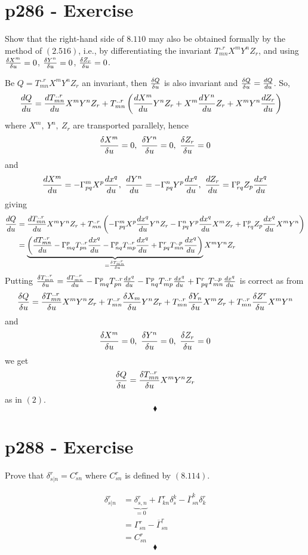 \section{p286 - Exercise}
\begin{tcolorbox}
Show that the right-hand side of $\mathbf{8.110}$ may also be obtained formally by the method of $\mathbf{(2.516)}$, i.e., by differentiating the invariant $T^{..r}_{mn}X^mY^nZ_r$, and using $\fdv{X^m}{u}=0$, $\fdv{Y^n}{u}=0$, $\fdv{Z_r}{u}=0$.
\end{tcolorbox}
Be $Q= T^{..r}_{mn}X^mY^nZ_r$ an invariant, then $\fdv{Q}{u}$ is also invariant and $\fdv{Q}{u} = \dv{Q}{u}$.
So,
\begin{align*}
\dv{Q}{u}&= \dv{T^{..r}_{mn}}{u}X^mY^nZ_r+ T^{..r}_{mn}\left(\dv{X^m}{u}Y^nZ_r+X^m\dv{Y^n}{u}Z_r +X^mY^n\dv{Z_r}{u}\right)
\end{align*}
where $X^m, \ Y^n, \ Z_r$ are transported parallely, hence  $$\fdv{X^m}{u} = 0, \ \fdv{Y^n}{u}=0 , \ \fdv{Z_r}{u}=0  $$
and 
$$\dv{X^m}{u} = -\Gamma^m_{pq}X^p\dv{x^q}{u}, \ \dv{Y^n}{u}=-\Gamma^n_{pq}Y^p\dv{x^q}{u} , \ \dv{Z_r}{u}=\Gamma^p_{rq}Z_p\dv{x^q}{u}  $$
giving
\begin{align}
\dv{Q}{u} &= \dv{T^{..r}_{mn}}{u}X^mY^nZ_r+ T^{..r}_{mn}\left(-\Gamma^m_{pq}X^p\dv{x^q}{u}Y^nZ_r  -\Gamma^n_{pq}Y^p\dv{x^q}{u}X^mZ_r+\Gamma^p_{rq}Z_p\dv{x^q}{u}X^mY^n\right)\\
&= \underbrace{\left(\dv{T^{..r}_{mn}}{u}-\Gamma^p_{mq}T^{..r}_{pn}\dv{x^q}{u} -\Gamma^p_{nq}T^{..r}_{mp}\dv{x^q}{u}+\Gamma^r_{pq}T^{..p}_{mn}\dv{x^q}{u}\right)}_{= \fdv{T^{..r}_{mn}}{u}}X^mY^nZ_r
\end{align}
Putting $   \fdv{T^{..r}_{mn}}{u} = \dv{T^{..r}_{mn}}{u}-\Gamma^p_{mq}T^{..r}_{pn}\dv{x^q}{u} -\Gamma^p_{nq}T^{..r}_{mp}\dv{x^q}{u}+\Gamma^r_{pq}T^{..p}_{mn}\dv{x^q}{u}$ is correct as from $$\fdv{Q}{u}= \fdv{T^{..r}_{mn}}{u}X^mY^nZ_r+ T^{..r}_{mn}\fdv{X_m}{u}Y^nZ_r+T^{..r}_{mn}\fdv{Y_{n}}{u}X^mZ_r+T^{..r}_{mn}\fdv{Z^{r}}{u}X^mY^n$$ and 
$$\fdv{X^m}{u} = 0, \ \fdv{Y^n}{u}=0 , \ \fdv{Z_r}{u}=0  $$
we get 
$$\fdv{Q}{u}= \fdv{T^{..r}_{mn}}{u}X^mY^nZ_r$$
as in $(2)$.  
$$\blacklozenge$$
\newpage




\section{p288 - Exercise}
\begin{tcolorbox}
Prove that $\delta^r_{s|n} = C^r_{sn}$ where $C^r_{sn}$ is defined by $\mathbf{(8.114)}$.
\end{tcolorbox}
\begin{align*}
 \delta^r_{s|n} &=\underbrace{\delta^r_{s,n} }_{=0}+ \Gamma^r_{kn}\delta^k_s - \overline{\Gamma}^k_{sn}\delta^r_k\\
 &=\Gamma^r_{sn} - \overline{\Gamma}^r_{sn}\\
 &= C^r_{sn}
\end{align*}
$$\blacklozenge$$
\\\\
